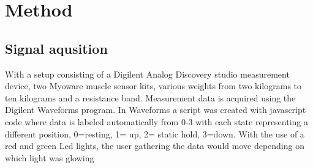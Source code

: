 \section{Method}
\label{section:method}



\subsection{Signal aqusition}
With a setup consisting of a Digilent Analog Discovery studio measurement device, two Myoware muscle sensor kits, various weights from two kilograms to ten kilograms and a resistance band.
Measurement data is acquired using the Digilent Waveforms program. In Waveforms a script was created with javascript code where data is labeled automatically from 0-3 with each state representing a different position,
0=resting, 1= up, 2= static hold, 3=down. With the use of a red and green Led lights, the user gathering the data would move depending on which light was glowing 



